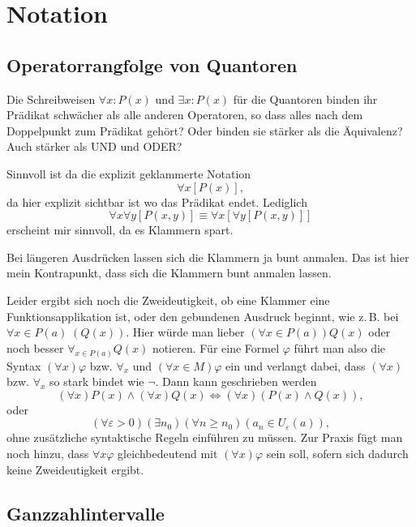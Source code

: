 \documentclass[a4paper,11pt,fleqn,twoside,BCOR=16mm]{scrartcl}
\begin{document}
\section{Notation}
\subsection{Operatorrangfolge von Quantoren}
Die Schreibweisen $\forall x\colon P(x)$ und $\exists x\colon P(x)$
für die Quantoren binden ihr Prädikat schwächer als alle anderen
Operatoren, so dass alles nach dem Doppelpunkt zum Prädikat gehört?
Oder binden sie stärker als die Äquivalenz? Auch stärker als UND und
ODER?

Sinnvoll ist da die explizit geklammerte Notation
\begin{equation}
\forall x[P(x)],
\end{equation}
da hier explizit sichtbar ist wo das Prädikat endet. Lediglich
\begin{equation}
\forall x\forall y [P(x,y)] \equiv \forall x[\forall y[P(x,y)]]
\end{equation}
erscheint mir sinnvoll, da es Klammern spart.

Bei längeren Ausdrücken lassen sich die Klammern ja bunt anmalen.
Das ist hier mein Kontrapunkt, dass sich die Klammern bunt
anmalen lassen.

Leider ergibt sich noch die Zweideutigkeit, ob eine Klammer eine
Funktionsapplikation ist, oder den gebundenen Ausdruck beginnt,
wie z.\,B. bei $\forall x{\in}P(a)\;(Q(x))$. Hier würde man lieber
$(\forall x{\in}P(a))Q(x)$ oder noch besser $\forall_{x\in P(a)} Q(x)$
notieren. Für eine Formel $\varphi$
führt man also die Syntax $(\forall x)\varphi$ bzw. $\forall_x$ und
$(\forall x{\in}M)\varphi$ ein und verlangt dabei, dass $(\forall x)$
bzw. $\forall_x$ so stark bindet wie $\neg$. Dann kann geschrieben werden
\begin{equation}
(\forall x)P(x)\land (\forall x)Q(x) \iff (\forall x)(P(x)\land Q(x)),
\end{equation}
oder
\begin{equation}
(\forall\varepsilon{>}0)(\exists n_0)(\forall n{\ge}n_0)(a_n\in U_\varepsilon(a)),
\end{equation}
ohne zusätzliche syntaktische Regeln einführen zu müssen.
Zur Praxis fügt man noch hinzu, dass $\forall x\varphi$ gleichbedeutend
mit $(\forall x)\varphi$ sein soll, sofern sich dadurch keine
Zweideutigkeit ergibt.

\subsection{Ganzzahlintervalle}
\end{document}
